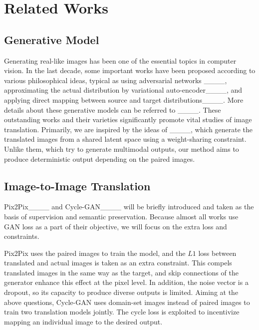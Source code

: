 \section{Related Works}
\label{sec2}
\subsection{Generative Model}\label{sec2.1}
Generating real-like images has been one of the essential topics in computer vision. In the last decade, some important works have been proposed according to various philosophical ideas, typical as using adversarial networks ____, approximating the actual distribution by variational auto-encoder____, and applying direct mapping between source and target distributions____. More details about these generative models can be referred to ____. These outstanding works and their varieties significantly promote vital studies of image translation. Primarily, we are inspired by the ideas of ____, which generate the translated images from a shared latent space using a weight-sharing constraint. Unlike them, which try to generate multimodal outputs, our method aims to produce deterministic output depending on the paired images.

\subsection{Image-to-Image Translation}\label{sec2.2}
Pix2Pix____ and Cycle-GAN____ will be briefly introduced and taken as the basis of supervision and semantic preservation. Because almost all works use GAN loss as a part of their objective, we will focus on the extra loss and constraints.

Pix2Pix uses the paired images to train the model, and the $L1$ loss between translated and actual images is taken as an extra constraint. This compels translated images in the same way as the target, and skip connections of the generator enhance this effect at the pixel level. In addition, the noise vector is a dropout, so its capacity to produce diverse outputs is limited. Aiming at the above questions, Cycle-GAN uses domain-set images instead of paired images to train two translation models jointly. The cycle loss is exploited to incentivize mapping an individual image to the desired output.

